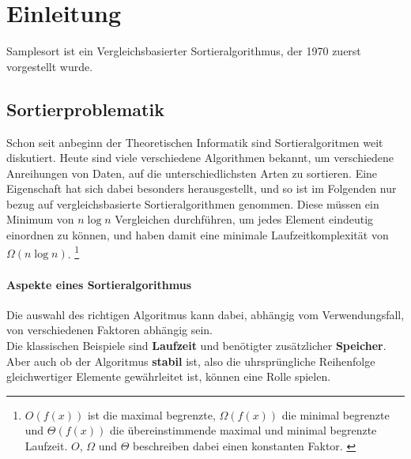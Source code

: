 \section{Einleitung}
    Samplesort ist ein Vergleichsbasierter Sortieralgorithmus, der 1970 zuerst vorgestellt wurde. \autocite{frazer-1970}
	\subsection{Sortierproblematik}
	Schon seit anbeginn der Theoretischen Informatik sind Sortieralgoritmen weit diskutiert.
	Heute sind viele verschiedene Algorithmen bekannt, um verschiedene Anreihungen von Daten, auf die unterschiedlichsten Arten zu sortieren.
	Eine Eigenschaft hat sich dabei besonders herausgestellt, und so ist im Folgenden nur bezug auf vergleichsbasierte Sortieralgorithmen genommen.
	Diese m\"ussen ein Minimum von $n\log{n}$ Vergleichen durchführen, um jedes Element eindeutig einordnen zu k\"onnen, und haben damit eine minimale Laufzeitkomplexit\"at von $\Omega(n\log{n})$.
	\footnote{$O(f(x))$ ist die maximal begrenzte, $\Omega(f(x))$ die minimal begrenzte und $\Theta(f(x))$ die übereinstimmende maximal und minimal begrenzte Laufzeit. $O$, $\Omega$ und $\Theta$ beschreiben dabei einen konstanten Faktor. \autocite[4]{sedgewick-1996}}
	
	\paragraph{Aspekte eines Sortieralgorithmus}
	Die auswahl des richtigen Algoritmus kann dabei, abhängig vom Verwendungsfall, von verschiedenen Faktoren abhängig sein.\\
	Die klassischen Beispiele sind \textbf{Laufzeit} und benötigter zusätzlicher \textbf{Speicher}.
	Aber auch ob der Algoritmus \textbf{stabil} ist, also die uhrsprüngliche Reihenfolge gleichwertiger Elemente gewährleitet ist, können eine Rolle spielen.

